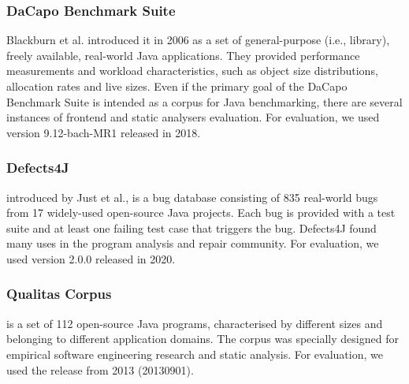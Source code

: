 
\subsubsection*{\textbf{DaCapo Benchmark Suite}}Blackburn et al. introduced it in 2006 as a set of general-purpose (i.e., library), freely available, real-world Java applications. They provided performance measurements and workload characteristics, such as object size distributions, allocation rates and live sizes. Even if the primary goal of the
DaCapo Benchmark Suite is intended as a corpus for Java benchmarking, there are
several instances of frontend and static analysers evaluation.
For evaluation, we used version 9.12-bach-MR1 released in 2018.

\subsubsection*{\textbf{Defects4J}}
introduced by Just et al., is a bug database consisting of 835 real-world bugs from 17 widely-used open-source Java projects.
Each bug is provided with a test suite and at least one failing test case that triggers the bug.
Defects4J found many uses in the program analysis and repair community.
For evaluation, we used version 2.0.0 released in 2020.

\subsubsection*{\textbf{Qualitas Corpus}}
 is  a set of 112 open-source Java programs, characterised by different sizes and belonging to different
application domains.  The corpus was specially designed for empirical software engineering research and static analysis.
For evaluation, we used the release from 2013 (20130901).

